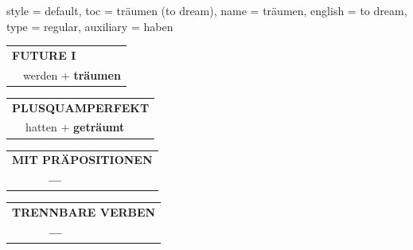 \begin{verbentry}{
  style = {default},
  toc = {träumen (to dream)},
  name = {träumen},
  english = {to dream},
  type = {regular},
  auxiliary = {haben}
}
\begin{tabular}{rl}
    \multicolumn{2}{l}{\textbf{FUTURE I} }\\
   & werden + \textbf{träumen}\\
 
  \end{tabular}
\hfill
   \begin{tabular}{rl}
      \multicolumn{2}{l}{\textbf{PLUSQUAMPERFEKT}}\\
   & hatten + \textbf{geträumt}\\
  \end{tabular}
  
  \vspace{10pt}


\begin{tabular}{lll}
\multicolumn{3}{l}{\textbf{MIT PRÄPOSITIONEN}}\\
& \textbf{---} & \\
\end{tabular}
\hfill
\begin{tabular}{lll}
\multicolumn{3}{l}{\textbf{TRENNBARE VERBEN}}\\
& \textbf{---} & \\
\end{tabular}

  \vspace{-5pt}
\end{verbentry}


